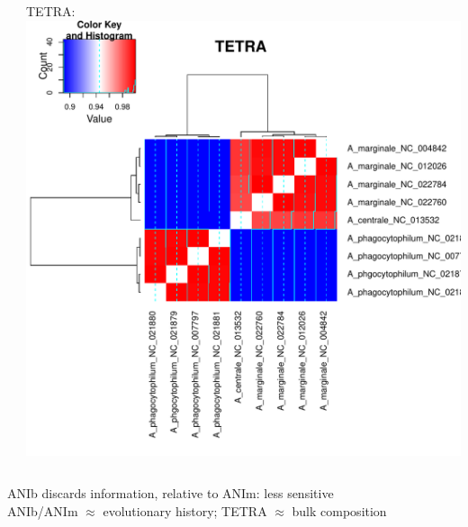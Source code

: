 \begin{frame}
\begin{columns}[T]
\begin{column}{4cm}
    \end{column}
    \begin{column}{4cm}   
    TETRA:\\
      \includegraphics[width=1\textwidth]{images/TETRA}
    \end{column}
  \end{columns}       
  ANIb discards information, relative to ANIm: less sensitive\\
  ANIb/ANIm $\approx$ evolutionary history; TETRA $\approx$ bulk composition
\end{frame}

